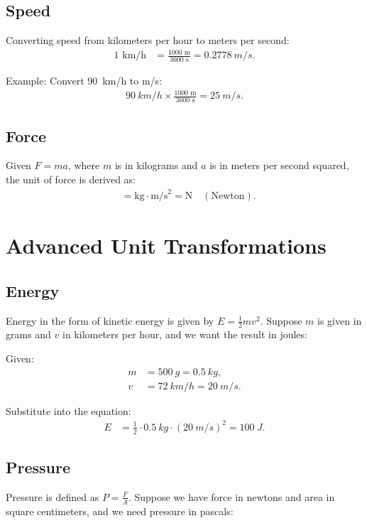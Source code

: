 \documentclass{article}
\begin{document}
\subsection{Speed}
Converting speed from kilometers per hour to meters per second:
\begin{align*}
1 \text{ km/h} &= \frac{1000 \text{ m}}{3600 \text{ s}} = \SI{0.2778}{m/s}.
\end{align*}

Example:
Convert \SI{90}{km/h} to \si{m/s}:
\begin{align*}
\SI{90}{km/h} \times \frac{1000 \text{ m}}{3600 \text{ s}} = \SI{25}{m/s}.
\end{align*}

\subsection{Force}
Given $F = ma$, where $m$ is in kilograms and $a$ is in meters per second squared, the unit of force is derived as:
\begin{align*}
[F] &= \text{kg} \cdot \text{m/s}^2 = \text{N} \quad (\text{Newton}).
\end{align*}

\section{Advanced Unit Transformations}

\subsection{Energy}
Energy in the form of kinetic energy is given by $E = \frac{1}{2}mv^2$. Suppose $m$ is given in grams and $v$ in kilometers per hour, and we want the result in joules:

Given:
\begin{align*}
m &= \SI{500}{g} = \SI{0.5}{kg}, \\
v &= \SI{72}{km/h} = \SI{20}{m/s}.
\end{align*}

Substitute into the equation:
\begin{align*}
E &= \frac{1}{2} \cdot \SI{0.5}{kg} \cdot (\SI{20}{m/s})^2 = \SI{100}{J}.
\end{align*}

\subsection{Pressure}
Pressure is defined as $P = \frac{F}{A}$. Suppose we have force in newtons and area in square centimeters, and we need pressure in pascals:
\end{document}
